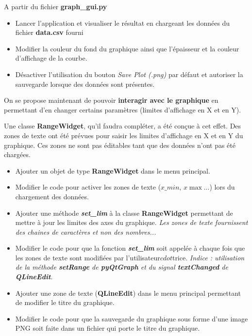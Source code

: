 \documentclass[a4paper,11pt,titlepage]{article} %
\begin{document}
A partir du fichier \textbf{graph\_gui.py}

\begin{itemize}
	\item Lancer l'application et visualiser le résultat en chargeant les données du fichier \textbf{data.csv} fourni
	\item Modifier la couleur du fond du graphique ainsi que l'épaisseur et la couleur d'affichage de la courbe.
	\item Désactiver l'utilisation du bouton \textit{Save Plot (.png)} par défaut et autoriser la sauvegarde lorsque des données sont présentes.
\end{itemize}

\medskip

On se propose maintenant de pouvoir \textbf{interagir avec le graphique} en permettant d'en changer certains paramètres (limites d'affichage en X et en Y).

Une classe \textbf{RangeWidget}, qu'il faudra compléter, a été conçue à cet effet. Des zones de texte ont été prévues pour saisir les limites d'affichage en X et en Y du graphique. Ces zones ne sont pas éditables tant que des données n'ont pas été chargées.

\begin{itemize}
	\item Ajouter un objet de type \textbf{RangeWidget} dans le menu principal.
	\item Modifier le code pour activer les zones de texte ($x\_min$, $x\max$...) lors du chargement des données.
	\item Ajouter une méthode \textsl{\textbf{set\_lim}} à la classe \textbf{RangeWidget} permettant de mettre à jour les limites des axes du graphique. \textit{Les zones de texte fournissent des chaines de caractères et non des nombres...}
	
	\medskip
	
	\item Modifier le code pour que la fonction \textsl{\textbf{set\_lim}} soit appelée à chaque fois que les zones de texte sont modifiées par l'utilisateur$cdot$trice. \textit{Indice : utilisation de la méthode \textsl{\textbf{setRange}} de \textbf{pyQtGraph} et du signal \textsl{\textbf{textChanged}} de \textbf{QLineEdit}.}
	
	\item Ajouter une zone de texte (\textbf{QLineEdit}) dans le menu principal permettant de modifier le titre du graphique.
	\item Modifier le code pour que la sauvegarde du graphique sous forme d'une image PNG soit faite dans un fichier qui porte le titre du graphique.
	
\end{itemize}
\end{document}

